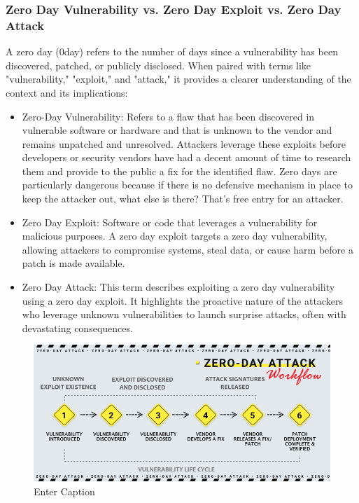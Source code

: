 \subsubsection{Zero Day Vulnerability vs. Zero Day Exploit vs. Zero Day Attack}
A zero day (0day) refers to the number of days since a vulnerability has been discovered, patched, or publicly disclosed.
    When paired with terms like "vulnerability," "exploit," and "attack," it provides a clearer understanding of the context and its implications:

\begin{itemize}
    \item Zero-Day Vulnerability: Refers to a flaw that has been discovered in vulnerable software or hardware and that is unknown to the vendor and remains unpatched and unresolved. Attackers leverage these exploits before developers or security vendors have had a decent amount of time to research them and provide to the public a fix for the identified flaw. Zero days are particularly dangerous because if there is no defensive mechanism in place to keep the attacker out, what else is there? That's free entry for an attacker.
    \item Zero Day Exploit: Software or code that leverages a vulnerability for malicious purposes. A zero day exploit targets a zero day vulnerability, allowing attackers to compromise systems, steal data, or cause harm before a patch is made available.
    \item Zero Day Attack: This term describes exploiting a zero day vulnerability using a zero day exploit. It highlights the proactive nature of the attackers who leverage unknown vulnerabilities to launch surprise attacks, often with devastating consequences.
\end{itemize}
\begin{figure}
    \centering
    \includegraphics[width=1\linewidth]{image.png}
    \caption{Enter Caption}
    \label{fig:image-placeholder}
\end{figure}
    

